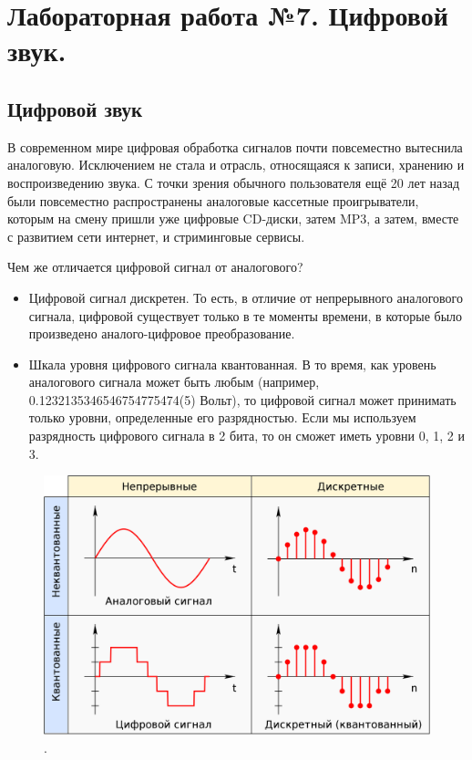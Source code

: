 \chapter{Лабораторная работа №7. Цифровой звук.}

\section{Цифровой звук}

В современном мире цифровая обработка сигналов почти повсеместно вытеснила аналоговую. Исключением не стала и отрасль, относящаяся к записи, хранению и воспроизведению звука. С точки зрения обычного пользователя ещё 20 лет назад были повсеместно распространены аналоговые кассетные проигрыватели, которым на смену пришли уже цифровые CD-диски, затем MP3, а затем, вместе с развитием сети интернет, и стриминговые сервисы.

Чем же отличается цифровой сигнал от аналогового?
\begin{itemize}
	\item Цифровой сигнал дискретен. То есть, в отличие от непрерывного аналогового сигнала, цифровой существует только в те моменты времени, в которые было произведено аналого-цифровое преобразование.
	\item Шкала уровня цифрового сигнала квантованная. В то время, как уровень аналогового сигнала может быть любым (например, 0.1232135346546754775474(5) Вольт), то цифровой сигнал может принимать только уровни, определенные его разрядностью. Если мы используем разрядность цифрового сигнала в 2 бита, то он сможет иметь уровни 0, 1, 2 и 3.

\end{itemize}

\begin{figure}[H]
	\centering
	\includegraphics [width=1\textwidth] {images/lab_7/digitizing.png}
	\caption{.}
	\label{lab7:pic1}
\end{figure}

